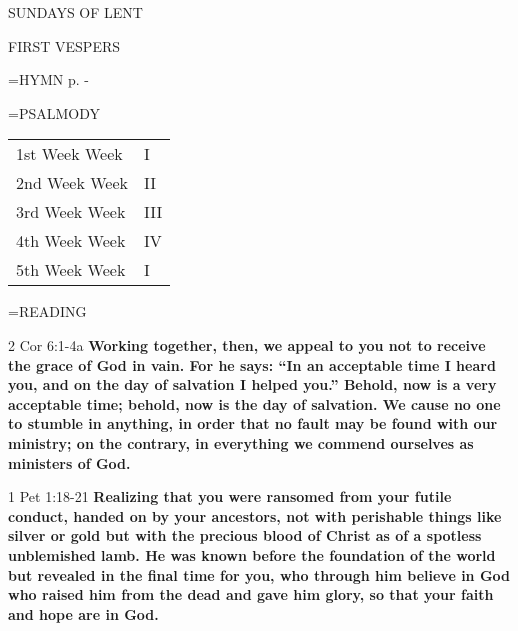 \begin{center}\normalsize SUNDAYS OF LENT\\
\end{center}

\begin{flushleft}\normalsize FIRST VESPERS\\\end{flushleft}

\hangindent=\parindent \small{\uppercase{HYMN} p. \pageref{lent:firstHymn}-\pageref{lent:lastHymn}\\}

\hangindent=\parindent \small{PSALMODY}
\begin{center}
\begin{tabular}{ l l }
1st Week	Week &  I\\
2nd Week	Week &  II\\
3rd Week	Week &  III\\
4th Week	Week &  IV\\
5th Week	Week &  I\\
\end{tabular}
\end{center}		

\hangindent=\parindent \small READING
\begin{description}[labelindent=\parindent, leftmargin=*]
\item [Weeks 1-4:]     2 Cor 6:1-4a \textbf{    Working together, then, we appeal to you not to receive the grace of God in vain. For he says: “In an acceptable time I heard you, and on the day of salvation I helped you.” Behold, now is a very acceptable time; behold, now is the day of salvation. We cause no one to stumble in anything, in order that no fault may be found with our ministry; on the contrary, in everything we commend ourselves as ministers of God.\\}
\item [Week 5:]     1 Pet 1:18-21 \textbf{    Realizing that you were ransomed from your futile conduct, handed on by your ancestors, not with perishable things like silver or gold but with the precious blood of Christ as of a spotless unblemished lamb. He was known before the foundation of the world but revealed in the final time for you, who through him believe in God who raised him from the dead and gave him glory, so that your faith and hope are in God. \\}
\end{description}

